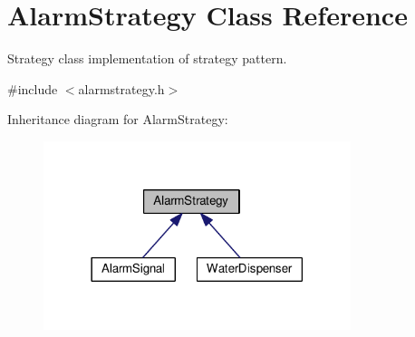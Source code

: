 \hypertarget{classAlarmStrategy}{}\section{Alarm\+Strategy Class Reference}
\label{classAlarmStrategy}


Strategy class implementation of strategy pattern.  




{\ttfamily \#include $<$alarmstrategy.\+h$>$}



Inheritance diagram for Alarm\+Strategy\+:\nopagebreak
\begin{figure}[H]
\begin{center}
\leavevmode
\includegraphics[width=254pt]{classAlarmStrategy__inherit__graph}
\end{center}
\end{figure}
